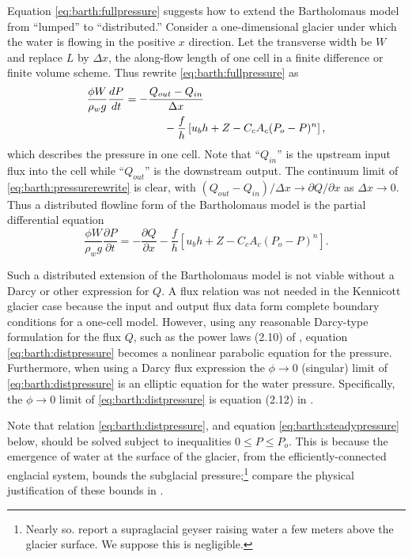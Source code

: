 \documentclass[twocolumn,letterpaper]{igs}
\begin{document}
Equation \eqref{eq:barth:fullpressure} suggests how to extend the Bartholomaus model from ``lumped'' to ``distributed.''  Consider a one-dimensional glacier under which the water is flowing in the positive $x$ direction.  Let the transverse width be $W$ and replace $L$ by $\Delta x$, the along-flow length of one cell in a finite difference or finite volume scheme.  Thus rewrite \eqref{eq:barth:fullpressure} as
\begin{align}
&\frac{\phi W}{\rho_w g}\frac{dP}{dt} = - \frac{Q_{out} - Q_{in}}{\Delta x}  \label{eq:barth:pressurerewrite} \\
&\qquad \qquad \qquad \quad - \frac{f}{h} \left[u_b h + Z - C_c A_c (P_o-P)^n\right], \notag
\end{align}
which describes the pressure in one cell.  Note that ``$Q_{in}$'' is the upstream input flux into the cell while ``$Q_{out}$'' is the downstream output.  The continuum limit of \eqref{eq:barth:pressurerewrite} is clear, with $(Q_{out} - Q_{in})/\Delta x \to \partial Q/\partial x$ as $\Delta x \to 0$.  Thus a distributed flowline form of the Bartholomaus model is the partial differential equation
\begin{equation}
\frac{\phi W}{\rho_w g} \frac{\partial P}{\partial t} = - \frac{\partial Q}{\partial x} - \frac{f}{h} \left[u_b h + Z - C_c A_c (P_o-P)^n\right]. \label{eq:barth:distpressure}
\end{equation}

Such a distributed extension of the Bartholomaus model is not viable without a Darcy or other expression for $Q$.  A flux relation was not needed in the Kennicott glacier case because the input and output flux data form complete boundary conditions for a one-cell model.  However, using any reasonable Darcy-type formulation for the flux $Q$, such as the power laws (2.10) of \cite{Schoofetal2012}, equation \eqref{eq:barth:distpressure} becomes a nonlinear parabolic equation for the pressure.  Furthermore, when using a Darcy flux expression the $\phi\to 0$ (singular) limit of \eqref{eq:barth:distpressure} is an elliptic equation for the water pressure.  Specifically, the $\phi\to 0$ limit of \eqref{eq:barth:distpressure} is equation (2.12) in \cite{Schoofetal2012}.

Note that relation \eqref{eq:barth:distpressure}, and equation \eqref{eq:barth:steadypressure} below, should be solved subject to inequalities $0 \le P \le P_o$.  This is because the emergence of water at the surface of the glacier, from the efficiently-connected englacial system, bounds the subglacial pressure;\footnote{Nearly so.  \cite{Bartholomausetal2011} report a supraglacial geyser raising water a few meters above the glacier surface.  We suppose this is negligible.} compare the physical justification of these bounds in \cite{Schoofetal2012}.
\end{document}
